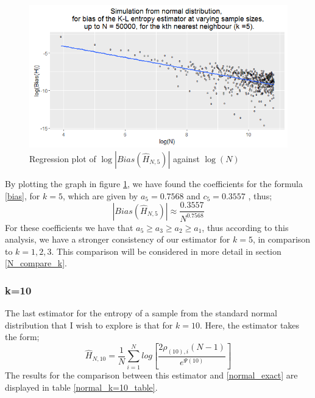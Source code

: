\documentclass{article}
\begin{document}
\begin{figure}
  \begin{center}
    \includegraphics[width=\textwidth]{./Graphs/Normal_k=5_plot.png}
  \end{center} 
\caption{Regression plot of $\log|Bias(\hat{H}_{N, 5})|$ against $\log(N)$}
  \label{normal_k=5_graph}
\end{figure}

By plotting the graph in figure \ref{normal_k=5_graph}, we have found the coefficients for the formula \ref{bias}, for $k=5$, which are given by $a_{5} = 0.7568$ and $c_{5} = 0.3557$ , thus;
\begin{equation}
|Bias(\hat{H}_{N, 5})| \approx \frac{0.3557}{N^{0.7568}} \nonumber
\end{equation}
For these coefficients we have that $a_{5} \geq a_{3} \geq a_{2} \geq a_{1}$, thus according to this analysis, we have a stronger consistency of our estimator for $k=5$, in comparison to $k=1, 2, 3$. This comparison will be considered in more detail in section \ref{N_compare_k}.




\subsubsection{k=10} \label{N_k=10}
The last estimator for the entropy of a sample from the standard normal distribution that I wish to explore is that for $k=10$. Here, the estimator takes the form;
\begin{equation}
\hat{H}_{N, 10} = \frac{1}{N} \sum_{i=1}^{N} log \left[ \frac{2\rho_{(10),i}(N-1)}{e^{\Psi(10)}} \right] \nonumber
\end{equation}
The results for the comparison between this estimator and \ref{normal_exact} are displayed in table \ref{normal_k=10_table}.
\end{document}
